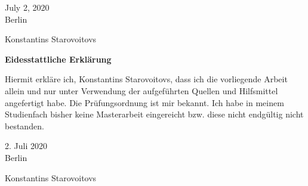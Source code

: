 \documentclass[12pt,twoside]{article}
\theoremstyle{plain}
\theoremstyle{plain}
\theoremstyle{definition}
\theoremstyle{remark}
\numberwithin{equation}{section}
\begin{document}
July 2, 2020 \\ Berlin
\vspace{0.5cm}


Konstantins Starovoitovs

\vspace{70pt}

{\Large\textbf{Eidesstattliche Erklärung}}

Hiermit erkläre ich, Konstantins Starovoitovs, dass ich die vorliegende Arbeit allein und nur unter Verwendung der aufgeführten Quellen und Hilfsmittel angefertigt habe. Die Prüfungsordnung ist mir bekannt. Ich habe in meinem Studienfach bisher keine Masterarbeit eingereicht bzw. diese nicht endgültig nicht bestanden.

\vspace{1cm}

2. Juli 2020 \\ Berlin
\vspace{0.5cm}



Konstantins Starovoitovs
\end{document}
